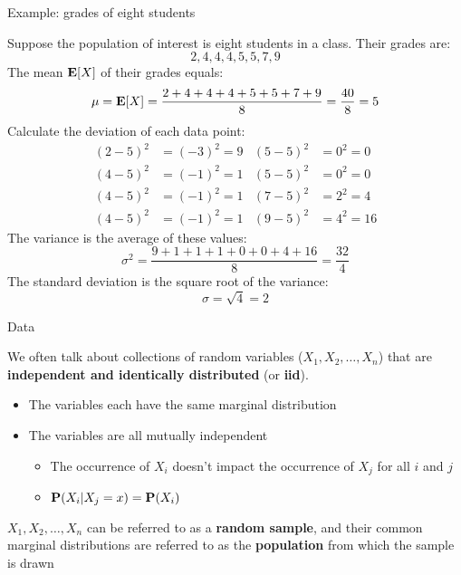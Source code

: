 \documentclass[compress, 8pt]{beamer}
\begin{document}
\begin{frame}{Example: grades of eight students}

Suppose the population of interest is eight students in a class. Their grades are:
\begin{equation*}
    2, 4, 4, 4, 5, 5, 7, 9
\end{equation*}
The mean $\mathbf{E} [X]$ of their grades equals:
\begin{equation*}
    \mu = \mathbf{E} [X] = \frac{2 + 4+4+4+5+5+7+9}{8} = \frac{40}{8} = 5
\end{equation*}
Calculate the deviation of each data point:
\begin{align*}
    (2-5)^2 &= (-3)^2 = 9     &(5-5)^2 &= 0^2 = 0 \\
    (4-5)^2 &= (-1)^2 = 1     &(5-5)^2 &= 0^2 = 0 \\
    (4-5)^2 &= (-1)^2 = 1     &(7-5)^2 &= 2^2 = 4 \\
    (4-5)^2 &= (-1)^2 = 1     &(9-5)^2 &= 4^2 = 16
\end{align*}
The variance is the average of these values:
\begin{equation*}
    \sigma^2 = \frac{9+1+1+1+0+0+4+16}{8} = \frac{32}{4}
\end{equation*}
The standard deviation is the square root of the variance:
\begin{equation*}
    \sigma = \sqrt{4} = 2
\end{equation*}

\end{frame}


\begin{frame}{Data}

We often talk about collections of random variables ($X_1, X_2, \dots, X_n$) that are \textbf{independent and identically distributed} (or \textbf{iid}).
\begin{itemize}
    \item The variables each have the same marginal distribution
    \item The variables are all mutually independent
    \begin{itemize}
        \item The occurrence of $X_i$ doesn't impact the occurrence of $X_j$ for all $i$ and $j$
        \item $\mathbf{P}(X_i \vert X_j = x) = \mathbf{P} (X_i)$
    \end{itemize}
\end{itemize}
$X_1, X_2, \dots, X_n$ can be referred to as a \textbf{random sample}, and their common marginal distributions are referred to as the \textbf{population} from which the sample is drawn

\end{frame}
\end{document}
